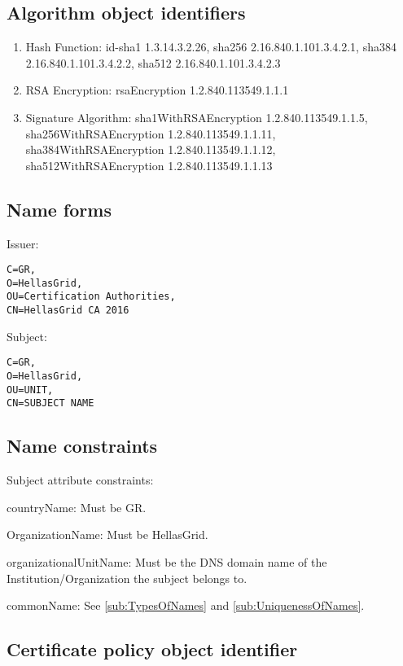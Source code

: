 \subsection{Algorithm object identifiers}

\begin{enumerate}
\item{Hash Function: id-sha1 1.3.14.3.2.26, sha256 2.16.840.1.101.3.4.2.1, sha384 2.16.840.1.101.3.4.2.2, sha512 2.16.840.1.101.3.4.2.3}
\item{RSA Encryption: rsaEncryption 1.2.840.113549.1.1.1}
\item{Signature Algorithm: sha1WithRSAEncryption 1.2.840.113549.1.1.5, sha256WithRSAEncryption 1.2.840.113549.1.1.11, sha384WithRSAEncryption 1.2.840.113549.1.1.12, sha512WithRSAEncryption 1.2.840.113549.1.1.13}
\end{enumerate}

\subsection{Name forms}

Issuer:

\begin{verbatim}
C=GR,
O=HellasGrid,
OU=Certification Authorities,
CN=HellasGrid CA 2016
\end{verbatim}

Subject:

\begin{verbatim}
C=GR,
O=HellasGrid,
OU=UNIT,
CN=SUBJECT NAME
\end{verbatim}

\subsection{Name constraints}

Subject attribute constraints:

countryName:
Must be GR.

OrganizationName:
Must be HellasGrid.

organizationalUnitName:
Must be the DNS domain name of the Institution/Organization the subject belongs to.

commonName:
See \ref{sub:TypesOfNames} and \ref{sub:UniquenessOfNames}.


\subsection{Certificate policy object identifier}

